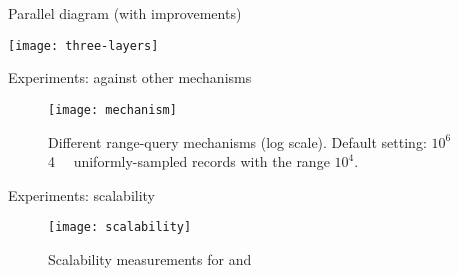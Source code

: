 	\begin{frame}{Parallel \epsolute{} diagram (with improvements)}

		\centering
		\texttt{[image: three-layers]}

	\end{frame}

	\begin{frame}{Experiments: against other mechanisms}

		\begin{figure}[h]
			\centering
			\texttt{[image: mechanism]}
			\caption{
				\centering
				Different range-query mechanisms (log scale).
				Default setting: $10^6$ \SI{4}{\kibi\byte} uniformly-sampled records with the range $10^4$.
			}%
		\end{figure}

	\end{frame}

	\begin{frame}{Experiments: scalability}

		\begin{figure}[h]
			\centering
			\texttt{[image: scalability]}
			\caption{Scalability measurements for \protocolGamma{} and \protocolNoGamma{}}%
		\end{figure}

	\end{frame}
